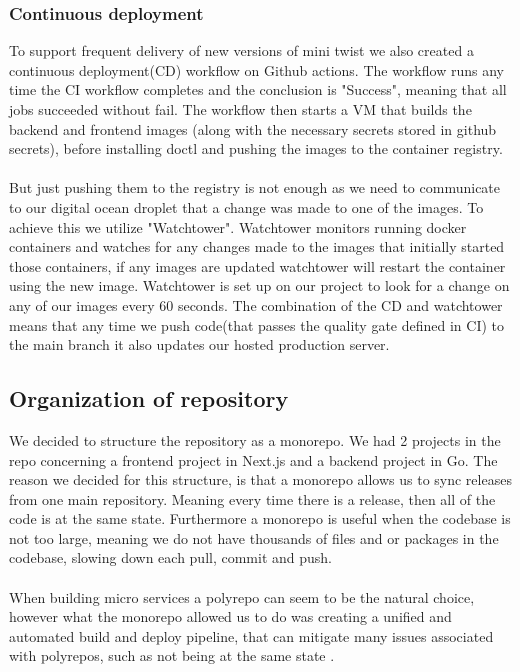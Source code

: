 \subsubsection{Continuous deployment}
To support frequent delivery of new versions of mini twist we also created a continuous deployment(CD) workflow on Github actions. The workflow runs any time the CI workflow completes and the conclusion is "Success", meaning that all jobs succeeded without fail. The workflow then starts a VM that builds the backend and frontend images (along with the necessary secrets stored in github secrets), before installing doctl and pushing the images to the container registry.\\\\
But just pushing them to the registry is not enough as we need to communicate to our digital ocean droplet that a change was made to one of the images. To achieve this we utilize "Watchtower"\cite{watchtower}. Watchtower monitors running docker containers and watches for any changes made to the images that initially started those containers, if any images are updated watchtower will restart the container using the new image. Watchtower is set up on our project to look for a change on any of our images every 60 seconds. The combination of the CD and watchtower means that any time we push code(that passes the quality gate defined in CI) to the main branch it also updates our hosted production server. 

\subsection{Organization of repository}
We decided to structure the repository as a monorepo. We had 2 projects in the repo concerning a frontend project in Next.js and a backend project in Go. The reason we decided for this structure, is that a monorepo allows us to sync releases from one main repository. Meaning every time there is a release, then all of the code is at the same state. Furthermore a monorepo is useful when the codebase is not too large, meaning we do not have thousands of files and or packages in the codebase, slowing down each pull, commit and push.
\\\\
When building micro services a polyrepo can seem to be the natural choice, however what the monorepo allowed us to do was creating a unified and automated build and deploy pipeline, that can mitigate many issues associated with polyrepos, such as not being at the same state \cite{monorepo_pros}. 

